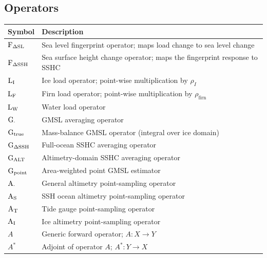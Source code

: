 \vspace{1em}

\subsection*{Operators}

\begin{longtable}{@{}lp{10cm}@{}}
    \toprule
    \textbf{Symbol} & \textbf{Description} \\
    \midrule
    $\operatorname{{F}}_{{\Delta \mathrm{SL}}}$                          & Sea level fingerprint operator; maps load change to sea level change \\
    $\operatorname{{F}}_{{\Delta \mathrm{SSH}}}$                         & Sea surface height change operator; maps the fingerprint response to SSHC \\
    $\operatorname{{L}}_{{\text{I}}}$                      & Ice load operator; point-wise multiplication by $\rho_I$ \\
    $\operatorname{{L}}_{{\text{F}}}$                     & Firn load operator; point-wise multiplication by $\rho_{\text{firn}}$ \\
    $\operatorname{{L}}_{{\text{W}}}$                    & Water load operator \\
    $\operatorname{{G}}_{{\cdot}}$                  & GMSL averaging operator \\
    $\operatorname{{G}}_{{\text{true}}}$            & Mass-balance GMSL operator (integral over ice domain) \\
    $\operatorname{{G}}_{{\Delta \mathrm{SSH}}}$                  & Full-ocean SSHC averaging operator \\
    $\operatorname{{G}}_{{\mathrm{ALT}}}$             & Altimetry-domain SSHC averaging operator \\
    $\operatorname{{G}}_{{\text{point}}}$           & Area-weighted point GMSL estimator \\
    $\operatorname{{A}}_{{\mathrm{\cdot}}}$             & General altimetry point-sampling operator \\
    $\operatorname{{A}}_{{\mathrm{S}}}$                   & SSH ocean altimetry point-sampling operator \\
    $\operatorname{{A}}_{{\mathrm{T}}}$                      & Tide gauge point-sampling operator \\
    $\operatorname{{A}}_{{\mathrm{I}}}$                     & Ice altimetry point-sampling operator \\
    $A$                                     & Generic forward operator; $A: X \to Y$ \\
    $A^*$                                   & Adjoint of operator $A$; $A^*: Y \to X$ \\

\end{longtable}
